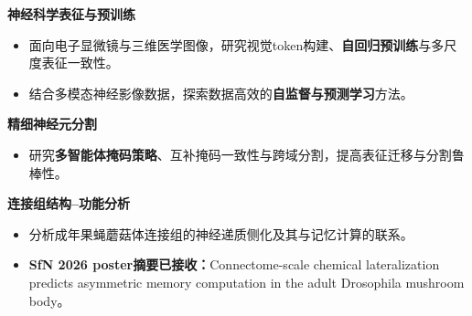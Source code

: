 \documentclass{resume}
\begin{document}
\begin{enumerate}[label=\textbf{[\arabic*]}, leftmargin=2em, itemsep=3pt]
    \item \kaishu \textbf{神经科学表征与预训练}
    \begin{itemize}
        \item 面向电子显微镜与三维医学图像，研究视觉token构建、\textbf{自回归预训练}与多尺度表征一致性。
        \item 结合多模态神经影像数据，探索数据高效的\textbf{自监督与预测学习}方法。
    \end{itemize}
    \item \kaishu \textbf{精细神经元分割}
    \begin{itemize}
        \item 研究\textbf{多智能体掩码策略}、互补掩码一致性与跨域分割，提高表征迁移与分割鲁棒性。
    \end{itemize}
    \item \kaishu \textbf{连接组结构--功能分析}
    \begin{itemize}
        \item 分析成年果蝇蘑菇体连接组的神经递质侧化及其与记忆计算的联系。
        \item \textbf{SfN 2026 poster摘要已接收：}Connectome-scale chemical lateralization predicts asymmetric memory computation in the adult Drosophila mushroom body。
    \end{itemize}
\end{enumerate}
\end{document}

